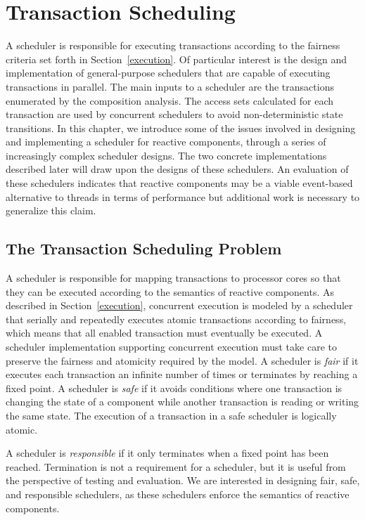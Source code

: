 \chapter{Transaction Scheduling}
\label{scheduler}

A scheduler is responsible for executing transactions according to the fairness criteria set forth in Section~\ref{execution}.
Of particular interest is the design and implementation of general-purpose schedulers that are capable of executing transactions in parallel.
The main inputs to a scheduler are the transactions enumerated by the composition analysis.
The access sets calculated for each transaction are used by concurrent schedulers to avoid non-deterministic state transitions.
In this chapter, we introduce some of the issues involved in designing and implementing a scheduler for reactive components, through a series of increasingly complex scheduler designs.
The two concrete implementations described later will draw upon the designs of these schedulers.
An evaluation of these schedulers indicates that reactive components may be a viable event-based alternative to threads in terms of performance but additional work is necessary to generalize this claim.

\section{The Transaction Scheduling Problem}
\label{scheduling_problem}

A scheduler is responsible for mapping transactions to processor cores so that they can be executed according to the semantics of reactive components.
As described in Section~\ref{execution}, concurrent execution is modeled by a scheduler that serially and repeatedly executes atomic transactions according to fairness, which means that all enabled transaction must eventually be executed.
A scheduler implementation supporting concurrent execution must take care to preserve the fairness and atomicity required by the model.
A scheduler is \emph{fair} if it executes each transaction an infinite number of times or terminates by reaching a fixed point.
A scheduler is \emph{safe} if it avoids conditions where one transaction is changing the state of a component while another transaction is reading or writing the same state.
The execution of a transaction in a safe scheduler is logically atomic.

A scheduler is \emph{responsible} if it only terminates when a fixed point has been reached.
Termination is not a requirement for a scheduler, but it is useful from the perspective of testing and evaluation.
We are interested in designing fair, safe, and responsible schedulers, as these schedulers enforce the semantics of reactive components.

